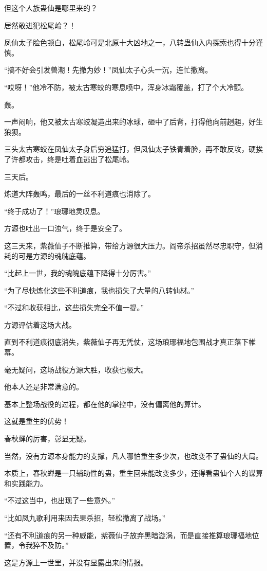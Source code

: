 \begin{this_body}
但这个人族蛊仙是哪里来的？

居然敢进犯松尾岭？！

凤仙太子脸色顿白，松尾岭可是北原十大凶地之一，八转蛊仙入内探索也得十分谨慎。

“搞不好会引发兽潮！先撤为妙！”凤仙太子心头一沉，连忙撤离。

“哎呀！”他冷不防，被太古寒蛟的寒息喷中，浑身冰霜覆盖，打了个大冷颤。

轰。

一声闷响，他又被太古寒蛟凝造出来的冰球，砸中了后背，打得他向前趔趄，好生狼狈。

三头太古寒蛟在凤仙太子身后穷追猛打，但凤仙太子铁青着脸，再不敢反攻，硬挨了许都攻击，终是吐着血逃出了松尾岭。

三天后。

炼道大阵轰鸣，最后的一丝不利道痕也消除了。

“终于成功了！”琅琊地灵叹息。

方源也吐出一口浊气，终于是安全了。

这三天来，紫薇仙子不断推算，带给方源很大压力。阎帝杀招虽然尽忠职守，但消耗的可是方源的魂魄底蕴。

“比起上一世，我的魂魄底蕴下降得十分厉害。”

“为了尽快炼化这些不利道痕，我也损失了大量的八转仙材。”

“不过和收获相比，这些损失完全不值一提。”

方源评估着这场大战。

直到不利道痕彻底消失，紫薇仙子再无凭仗，这场琅琊福地包围战才真正落下帷幕。

毫无疑问，这场战役方源大胜，收获也极大。

他本人还是非常满意的。

基本上整场战役的过程，都在他的掌控中，没有偏离他的算计。

这就是重生的优势！

春秋蝉的厉害，彰显无疑。

当然，没有方源本身能力的支撑，凡人哪怕重生多少次，也改变不了蛊仙的大局。

本质上，春秋蝉是一只辅助性的蛊，重生回来能改变多少，还得看蛊仙个人的谋算和实践能力。

“不过这当中，也出现了一些意外。”

“比如凤九歌利用来因去果杀招，轻松撤离了战场。”

“还有不利道痕的另一种威能，紫薇仙子放弃黑暗漩涡，而是直接推算琅琊福地位置，令我猝不及防。”

这是方源上一世里，并没有显露出来的情报。


\end{this_body}
